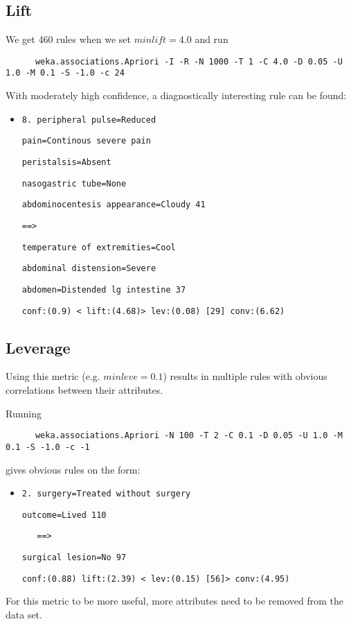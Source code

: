\subsection{Lift}
We get 460 rules when we set $minlift = 4.0$ and run
\begin{verbatim}
	  weka.associations.Apriori -I -R -N 1000 -T 1 -C 4.0 -D 0.05 -U 1.0 -M 0.1 -S -1.0 -c 24
\end{verbatim}
With moderately high confidence, a diagnostically interesting rule can be found:
\begin{itemize}
\item   \verb|8. peripheral pulse=Reduced|

\verb|pain=Continous severe pain| 

\verb|peristalsis=Absent| 

\verb|nasogastric tube=None| 

\verb|abdominocentesis appearance=Cloudy 41 |


\verb|==>| 


\verb|temperature of extremities=Cool| 

\verb|abdominal distension=Severe |

\verb|abdomen=Distended lg intestine 37 | 
  
\verb|conf:(0.9) < lift:(4.68)> lev:(0.08) [29] conv:(6.62)|

\end{itemize}



\subsection{Leverage} \label{sec: leve}
Using this metric (e.g. $minleve = 0.1$) results in multiple rules with obvious correlations between their attributes.

\noindent
Running
\begin{verbatim}
	  weka.associations.Apriori -N 100 -T 2 -C 0.1 -D 0.05 -U 1.0 -M 0.1 -S -1.0 -c -1
\end{verbatim} 

\noindent
gives obvious rules on the form:
\begin{itemize}
\item \verb|2. surgery=Treated without surgery| 

\verb|outcome=Lived 110|


\verb|   ==>|
 
\verb|surgical lesion=No 97|

\verb|conf:(0.88) lift:(2.39) < lev:(0.15) [56]> conv:(4.95)|
\end{itemize}
For this metric to be more useful, more attributes need to be removed from the data set.


